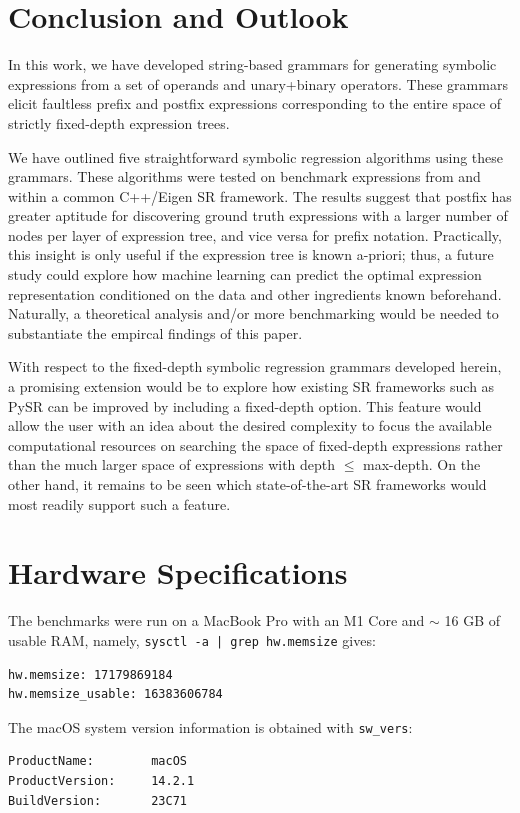\documentclass[runningheads]{llncs}
\begin{document}
\section{Conclusion and Outlook}
In this work, we have developed string-based grammars for generating symbolic expressions from a set of operands and unary+binary operators. These grammars elicit faultless prefix and postfix expressions corresponding to the entire space of strictly fixed-depth expression trees. 
\par We have outlined five straightforward symbolic regression algorithms using these grammars. These algorithms were tested on benchmark expressions from \cite{hemberg2008pre} and \cite{udrescu2020ai} within a common C++/Eigen SR framework. The results suggest that postfix has greater aptitude for discovering ground truth expressions with a larger number of nodes per layer of expression tree, and vice versa for prefix notation. Practically, this insight is only useful if the expression tree is known a-priori; thus, a future study could explore how machine learning can predict the optimal expression representation conditioned on the data and other ingredients known beforehand. Naturally, a theoretical analysis and/or more benchmarking would be needed to substantiate the empircal findings of this paper. 
\par 
\par With respect to the fixed-depth symbolic regression grammars developed herein, a promising extension would be to explore how existing SR frameworks such as PySR can be improved by including a fixed-depth option. This feature would allow the user with an idea about the desired complexity to focus the available computational resources on searching the space of fixed-depth expressions rather than the much larger space of expressions with depth $\leq$ max-depth. On the other hand, it remains to be seen which state-of-the-art SR frameworks would most readily support such a feature.


\newpage




\newpage 

\appendix
\section{Hardware Specifications}
The benchmarks were run on a MacBook Pro with an M1 Core and $\sim$ 16 GB of usable RAM, namely, \texttt{sysctl -a | grep hw.memsize} gives: 
\begin{verbatim}
hw.memsize: 17179869184
hw.memsize_usable: 16383606784
\end{verbatim}
The macOS system version information is obtained with \texttt{sw\_vers}:
\begin{verbatim}
ProductName:		macOS
ProductVersion:		14.2.1
BuildVersion:		23C71
\end{verbatim}
\end{document}
